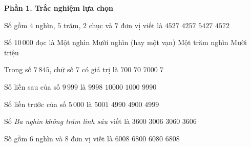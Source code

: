 \textbf{Phần 1. Trắc nghiệm lựa chọn}

\begin{ex} %
Số gồm $4$ nghìn, $5$ trăm, $2$ chục và $7$ đơn vị viết là
\choice
{\True $4527$}
{$4257$}
{$5427$}
{$4572$}
\end{ex}

\begin{ex} %
Số $10\,000$ đọc là
\choice
{Một nghìn}
{\True Mười nghìn (hay một vạn)}
{Một trăm nghìn}
{Mười triệu}
\end{ex}

\begin{ex} %
Trong số $7\,845$, chữ số 7 có giá trị là
\choice
{$700$}
{$70$}
{\True $7000$}
{$7$}
\end{ex}

\begin{ex} %
Số liền sau của số $9\,999$ là
\choice
{$9998$}
{\True $10000$}
{$1000$}
{$9990$}
\end{ex}

\begin{ex} %
Số liền trước của số $5\,000$ là
\choice
{$5001$}
{$4990$}
{$4900$}
{\True $4999$}
\end{ex}

\begin{ex} %
Số \textit{Ba nghìn không trăm linh sáu} viết là
\choice
{$3600$}
{\True $3006$}
{$3060$}
{$3606$}
\end{ex}

\begin{ex} %
Số gồm $6$ nghìn và $8$ đơn vị viết là
\choice
{\True $6008$}
{$6800$}
{$6080$}
{$6808$}
\end{ex}

